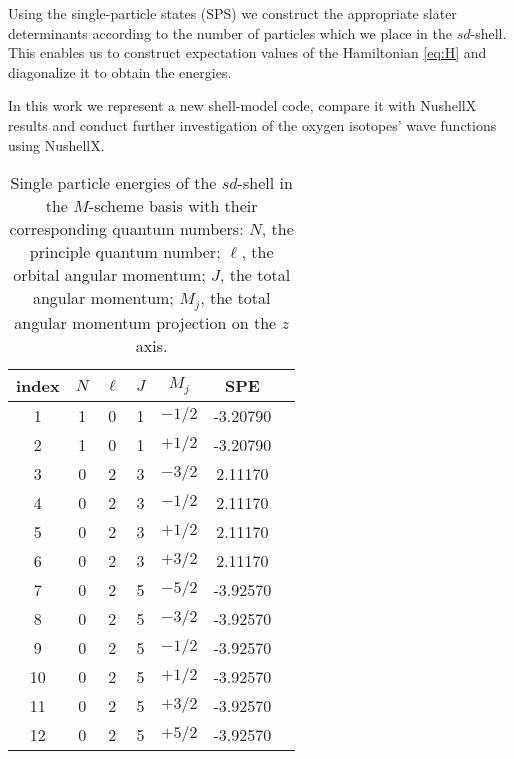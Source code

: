 Using the single-particle states (SPS) we construct the appropriate slater determinants according to the number of particles which we place in the $sd$-shell. This enables us to construct expectation values of the Hamiltonian \eqref{eq:H} and diagonalize it to obtain the energies. 

In this work we represent a new shell-model code, compare it with NushellX results and conduct further investigation of the oxygen isotopes' wave functions using NushellX.

\begin{table}[H]
\caption{Single particle energies of the $sd$-shell in the $M$-scheme basis with their corresponding quantum numbers: $N$, the principle quantum number; $\ell$, the orbital angular momentum; $J$, the total angular momentum; $M_j$, the total angular momentum projection on the $z$ axis. \label{tab:SPE}}
\begin{ruledtabular}
\begin{tabular}{c|cccccc}
index	&	$N$	&	$\ell$	&	$J$	&	$M_j$	&	SPE			\\
\hline 
1		&	1	&	0		&	1	&	$-1/2$	&	-3.20790	\\
2		&	1	&	0		&	1	&	$+1/2$	&	-3.20790	\\
3		& 	0	&	2		&	3	&	$-3/2$	&	 2.11170	\\
4		&	0	&	2		&	3	&	$-1/2$	&	 2.11170	\\
5		&	0	&	2		&	3	&	$+1/2$	&	 2.11170	\\
6		&	0	&	2		&	3	&	$+3/2$	&	 2.11170	\\
7		&	0	&	2		&	5	&	$-5/2$	&	-3.92570	\\
8		&	0	&	2		&	5	&	$-3/2$	&	-3.92570	\\
9		&	0	&	2		&	5	&	$-1/2$	&	-3.92570	\\
10		&	0	&	2		&	5	&	$+1/2$	&	-3.92570	\\
11		&	0	&	2		&	5	&	$+3/2$	&	-3.92570	\\
12		&	0	&	2		&	5	&	$+5/2$	&	-3.92570	
\end{tabular}
\end{ruledtabular}
\end{table}